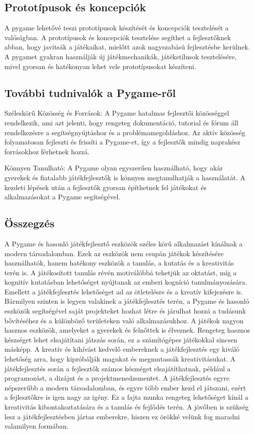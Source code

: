 \subsection{Prototípusok és koncepciók}
\indent \indent A pygame lehetővé teszi prototípusok készítését és koncepciók tesztelését a valóságban. A prototípusok és koncepciók tesztelése segíthet a fejlesztőknek abban, hogy javítsák a játékaikat, mielőtt azok nagyszabású fejlesztésbe kerülnek. A pygamet gyakran használják új játékmechanikák, játékstílusok tesztelésére, mivel gyorsan és hatékonyan lehet vele prototípusokat készíteni.

\subsection{További tudnivalók a Pygame-ről}

\indent \indent Széleskörű Közösség és Források:
A Pygame hatalmas fejlesztői közösséggel rendelkezik, ami azt jelenti, hogy rengeteg dokumentáció, tutorial és fórum áll rendelkezésre a segítségnyújtáshoz és a problémamegoldáshoz. Az aktív közösség folyamatosan fejleszti és frissíti a Pygame-et, így a fejlesztők mindig naprakész forrásokhoz férhetnek hozzá.

Könnyen Tanulható:
A Pygame olyan egyszerűen használható, hogy akár gyerekek és fiatalabb játékfejlesztők is könnyen megtanulhatják a használatát. A kezdeti lépések után a fejlesztők gyorsan építhetnek fel játékokat és alkalmazásokat a Pygame segítségével.


\subsection{Összegzés}
\indent \indent A Pygame és hasonló játékfejlesztő eszközök széles körű alkalmazást kínálnak a modern társadalomban.
 Ezek az eszközök nem csupán játékok készítésére használhatók, hanem hatékony eszközök a tanulás,
  a kutatás és a kreativitás terén is. A játékosított tanulás révén motiválóbbá tehetjük az oktatást, 
  míg a kognitív kutatásban lehetőséget nyújtanak az emberi kogníció tanulmányozására.
   Emellett a játékfejlesztés lehetőséget ad az ötletelésre és a kreatív kifejezésre is.
    Bármilyen szinten is legyen valakinek a játékfejlesztés terén,
 a Pygame és hasonló eszközök segítségével saját projekteket hozhat létre és járulhat hozzá
  a tudásunk bővítéséhez és a különböző területeken való alkalmazásukhoz.
   A játékok nagyon hasznos eszközök, amelyeket a gyerekek és felnőttek is élveznek.
    Rengeteg hasznos készséget lehet elsajátítani játszás során, ez a számítógépes játékokkal sincsen másképp.
A kreatív és kihívást kedvelő embereknek a játékfejlesztés egy kiváló lehetőség arra,
 hogy kipróbálják magukat és megmutassák kreativitásukat.
  A játékfejlesztés során a fejlesztők számos készséget elsajátíthatnak, például a programozást,
a dizájnt és a projektmenedzsmentet. A játékfejlesztés egyre népszerűbb a modern társadalomban,
 és egyre több ember kezd el játszani, ezért a fejlesztőkre is igen nagy az igény. 
 Ez a fajta munka rengeteg lehetőséget kínál a kreativitás kibontakoztatására és a tanulás és fejlődés terén.
  A jövőben is szükség lesz a játékfejlesztésben jártas emberekre, hiszen ez örökké velünk
   fog maradni valamilyen formában.


